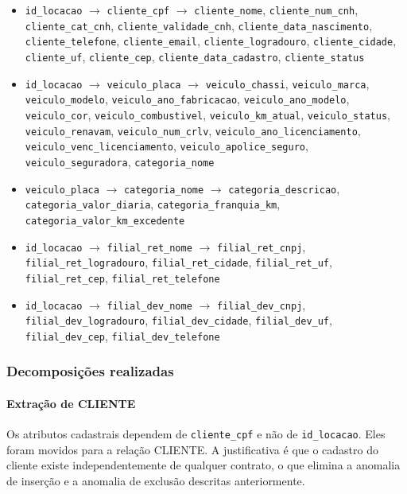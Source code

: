{\raggedright
\begin{itemize}
\item \texttt{id\_locacao} $\rightarrow$ \texttt{cliente\_cpf} $\rightarrow$ \texttt{cliente\_nome}, \texttt{cliente\_num\_cnh}, \texttt{cliente\_cat\_cnh}, \texttt{cliente\_validade\_cnh}, \texttt{cliente\_data\_nascimento}, \texttt{cliente\_telefone}, \texttt{cliente\_email}, \texttt{cliente\_logradouro}, \texttt{cliente\_cidade}, \texttt{cliente\_uf}, \texttt{cliente\_cep}, \texttt{cliente\_data\_cadastro}, \texttt{cliente\_status}
\item \texttt{id\_locacao} $\rightarrow$ \texttt{veiculo\_placa} $\rightarrow$ \texttt{veiculo\_chassi}, \texttt{veiculo\_marca}, \texttt{veiculo\_modelo}, \texttt{veiculo\_ano\_fabricacao}, \texttt{veiculo\_ano\_modelo}, \texttt{veiculo\_cor}, \texttt{veiculo\_combustivel}, \texttt{veiculo\_km\_atual}, \texttt{veiculo\_status}, \texttt{veiculo\_renavam}, \texttt{veiculo\_num\_crlv}, \texttt{veiculo\_ano\_licenciamento}, \texttt{veiculo\_venc\_licenciamento}, \texttt{veiculo\_apolice\_seguro}, \texttt{veiculo\_seguradora}, \texttt{categoria\_nome}
\item \texttt{veiculo\_placa} $\rightarrow$ \texttt{categoria\_nome} $\rightarrow$ \texttt{categoria\_descricao}, \texttt{categoria\_valor\_diaria}, \texttt{categoria\_franquia\_km}, \texttt{categoria\_valor\_km\_excedente}
\item \texttt{id\_locacao} $\rightarrow$ \texttt{filial\_ret\_nome} $\rightarrow$ \texttt{filial\_ret\_cnpj}, \texttt{filial\_ret\_logradouro}, \texttt{filial\_ret\_cidade}, \texttt{filial\_ret\_uf}, \texttt{filial\_ret\_cep}, \texttt{filial\_ret\_telefone}
\item \texttt{id\_locacao} $\rightarrow$ \texttt{filial\_dev\_nome} $\rightarrow$ \texttt{filial\_dev\_cnpj}, \texttt{filial\_dev\_logradouro}, \texttt{filial\_dev\_cidade}, \texttt{filial\_dev\_uf}, \texttt{filial\_dev\_cep}, \texttt{filial\_dev\_telefone}
\end{itemize}
\par}

\subsubsection{Decomposi\c{c}\~oes realizadas}

\paragraph{Extra\c{c}\~ao de CLIENTE} Os atributos cadastrais dependem de \texttt{cliente\_cpf} e n\~ao de \texttt{id\_locacao}. Eles foram movidos para a rela\c{c}\~ao CLIENTE. A justificativa \'e que o cadastro do cliente existe independentemente de qualquer contrato, o que elimina a anomalia de inser\c{c}\~ao e a anomalia de exclus\~ao descritas anteriormente.

